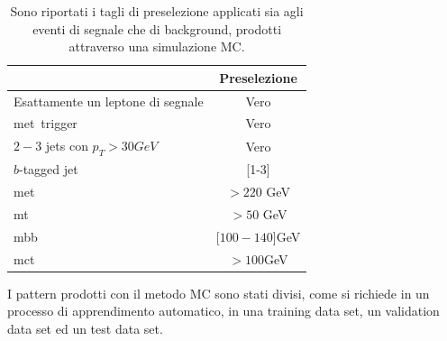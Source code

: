 \begin{table}[h!]
	\centering
	\begin{tabular}{lc}
		\hline
		&Preselezione \\
		\hline
		Esattamente un leptone di segnale&Vero\\
		met\ trigger&Vero\\
		$2-3$ jets con $p_{T}>30 GeV$&Vero\\
		$b$-tagged jet&[1-3]\\
		met\ &$> 220$ GeV\\
		mt\ &$> 50$ GeV\\
		mbb\ &[$100-140$]GeV\\
		mct\ &$>100$GeV\\
		\hline
	\end{tabular}
	\caption{Sono riportati i tagli di preselezione applicati sia agli eventi di segnale che di background, prodotti attraverso una simulazione MC.}
	\label{tab:tagli di preselezione}
\end{table} 
I pattern prodotti con il metodo MC sono stati divisi, come si richiede in un processo di apprendimento automatico, in una training data set, un validation data set ed un test data set.
\newpage

